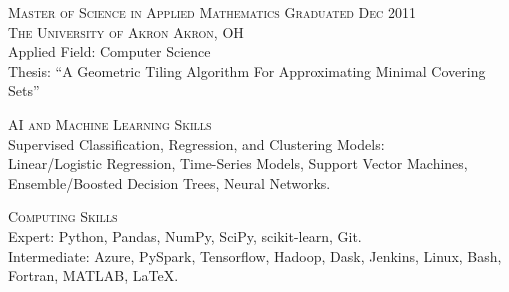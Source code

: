 \documentclass[letterpaper, 10pt]{article} %
\begin{document}
\textsc{Master of Science in Applied Mathematics} \hfill \textsc{Graduated Dec 2011} \\
\textsc{The University of Akron \hfill Akron, OH} \\
Applied Field: Computer Science \\
Thesis: ``A Geometric Tiling Algorithm For Approximating Minimal Covering Sets'' \





\textsc{AI and Machine Learning Skills} \\
    Supervised Classification, Regression, and Clustering Models: \\
    Linear/Logistic Regression,
    Time-Series Models,
    Support Vector Machines,
    Ensemble/Boosted Decision Trees,
    Neural Networks.

    
\textsc{Computing Skills} \\
    Expert:
        Python,
        Pandas,
        NumPy,
        SciPy,
        scikit-learn,
        Git. \\
    Intermediate:
        Azure,
        PySpark,
        Tensorflow,
        Hadoop,
        Dask,
        Jenkins,
        Linux,
        Bash,
        Fortran,
        MATLAB,
        \LaTeX. \\

\vspace*{\fill}
\end{document}
